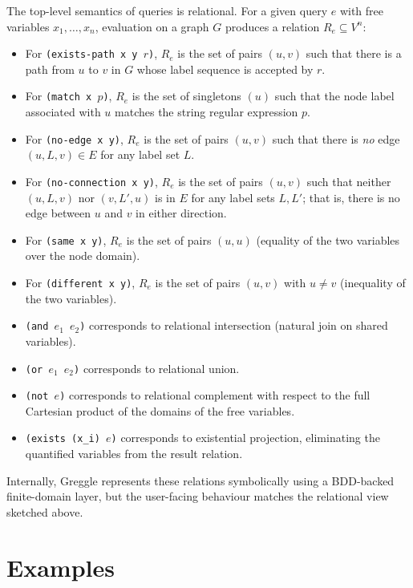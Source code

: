 \documentclass[11pt]{article}
\begin{document}
The top-level semantics of queries is relational.  For a given query
$e$ with free variables $x_1,\dots,x_n$, evaluation on a graph $G$
produces a relation $R_e \subseteq V^n$:
\begin{itemize}[leftmargin=*]
  \item For \texttt{(exists-path x y $r$)}, $R_e$ is the set of pairs
        $(u,v)$ such that there is a path from $u$ to $v$ in $G$ whose
        label sequence is accepted by $r$.
  \item For \texttt{(match x $p$)}, $R_e$ is the set of singletons
        $(u)$ such that the node label associated with $u$ matches the
        string regular expression $p$.
  \item For \texttt{(no-edge x y)}, $R_e$ is the set of pairs $(u,v)$
        such that there is \emph{no} edge $(u,L,v) \in E$ for any
        label set $L$.
  \item For \texttt{(no-connection x y)}, $R_e$ is the set of pairs
        $(u,v)$ such that neither $(u,L,v)$ nor $(v,L',u)$ is in $E$
        for any label sets $L,L'$; that is, there is no edge between
        $u$ and $v$ in either direction.
  \item For \texttt{(same x y)}, $R_e$ is the set of pairs $(u,u)$
        (equality of the two variables over the node domain).
  \item For \texttt{(different x y)}, $R_e$ is the set of pairs
        $(u,v)$ with $u \neq v$ (inequality of the two variables).
  \item \texttt{(and $e_1$ $e_2$)} corresponds to relational
        intersection (natural join on shared variables).
  \item \texttt{(or $e_1$ $e_2$)} corresponds to relational union.
  \item \texttt{(not $e$)} corresponds to relational complement with
        respect to the full Cartesian product of the domains of the
        free variables.
  \item \texttt{(exists (x\_i) $e$)} corresponds to existential
        projection, eliminating the quantified variables from the
        result relation.
\end{itemize}

Internally, Greggle represents these relations symbolically using a
BDD-backed finite-domain layer, but the user-facing behaviour matches
the relational view sketched above.

\section{Examples}
\end{document}
